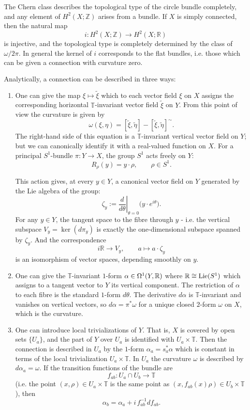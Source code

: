 \documentclass[12pt]{article}
\begin{document}
The Chern class describes the topological type of the circle bundle completely, and any element of $H^2(X; \mathbb{Z})$ arises from a bundle. If $X$ is simply connected, then the natural map
\[
i : H^2(X; \mathbb{Z}) \longrightarrow H^2(X; \mathbb{R})
\]
is injective, and the topological type is completely determined by the class of $\omega / 2\pi$. In general the kernel of $i$ corresponds to the flat bundles, i.e. those which can be given a connection with curvature zero.

Analytically, a connection can be described in three ways:

\begin{enumerate}
    \item 
One can give the map $\xi \mapsto \tilde{\xi}$ which to each vector field $\xi$ on $X$ assigns the corresponding horizontal $\mathbb{T}$-invariant vector field $\tilde{\xi}$ on $Y$. From this point of view the curvature is given by
\[
\omega(\xi, \eta) = [\tilde{\xi}, \tilde{\eta}] - [\tilde{\xi}, \tilde{\eta}]^{\sim}.
\]
The right-hand side of this equation is a $\mathbb{T}$-invariant vertical vector field on $Y$; but we can canonically identify it with a real-valued function on $X$. For a principal $S^1$-bundle $\pi : Y \to X$, the group $S^1$ acts freely on $Y$:
\[
R_\rho(y) = y \cdot \rho, \qquad \rho \in S^1.
\]

This action gives, at every $y \in Y$, a canonical vector field on $Y$ generated by the Lie algebra of the group:
\[
\zeta_y := \left.\frac{d}{d\theta}\right|_{\theta=0} \big( y \cdot e^{i\theta} \big).
\]
For any $y\in Y$, the tangent space to the fibre through $y$ - i.e. the vertical subspace $V_y = \ker(d\pi_y)$ is exactly the one-dimensional subspace spanned by $\zeta_y$. And the correspondence
\[
i\mathbb{R} \longrightarrow V_y,\qquad a \longmapsto a \cdot \zeta_y
\]
is an isomorphism of vector spaces, depending smoothly on $y$.

\item One can give the $\mathbb{T}$-invariant $1$-form $\alpha\in \Omega^1(Y,\mathbb{R})$ where $\mathbb{R}\cong \operatorname{Lie}(S^1)$ which assigns to a tangent vector to $Y$ its vertical component. The restriction of $\alpha$ to each fibre is the standard $1$-form $d\theta$. The derivative $d\alpha$ is $\mathbb{T}$-invariant and vanishes on vertical vectors, so $d\alpha = \pi^*\omega$ for a unique closed $2$-form $\omega$ on $X$, which is the curvature.

\item One can introduce local trivializations of $Y$. That is, $X$ is covered by open sets $\{U_a\}$, and the part of $Y$ over $U_a$ is identified with $U_a \times \mathbb{T}$. Then the connection is described in $U_a$ by the $1$-form $\alpha_a = s_a^*\alpha$ which is constant in terms of the local trivialization $U_a \times \mathbb{T}$. In $U_a$ the curvature $\omega$ is described by $d\alpha_a = \omega$. If the transition functions of the bundle are
\[
f_{ab} : U_a \cap U_b \longrightarrow \mathbb{T}
\]
(i.e. the point $(x,\rho) \in U_a \times \mathbb{T}$ is the same point as $(x, f_{ab}(x)\rho) \in U_b \times \mathbb{T}$), then
\[
\alpha_b = \alpha_a + i\, f_{ab}^{-1} d f_{ab}.
\]
\end{enumerate}
\end{document}
